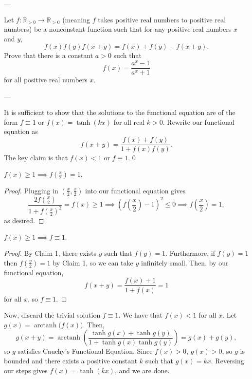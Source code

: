 
---

Let $f:\mathbb R_{>0}\to\mathbb R_{>0}$ (meaning $f$ takes positive real numbers to positive real numbers) be a nonconstant function such that for any positive real numbers $x$ and $y$, \[f(x)f(y)f(x+y)=f(x)+f(y)-f(x+y).\]
Prove that there is a constant $a>0$ such that \[f(x)=\frac{a^x-1}{a^x+1}\]
for all positive real numbers $x$.

---

It is sufficient to show that the solutions to the functional equation are of the form $f\equiv 1$ or $f(x)=\tanh(kx)$ for all real $k>0$. Rewrite our functional equation as \[f(x+y)=\frac{f(x)+f(y)}{1+f(x)f(y)}.\]The key claim is that $f(x)<1$ or $f\equiv 1$.
\setcounter{iclaim}0
\begin{iclaim}
    $f(x)\ge 1\implies f(\tfrac x2)=1$.
\end{iclaim}
\begin{proof}
    Plugging in $(\tfrac x2, \tfrac x2)$ into our functional equation gives \[\frac{2f(\tfrac x2)}{1+f(\tfrac x2)^2}=f(x)\ge 1\implies \left(f\left(\frac x2\right)-1\right)^2\le 0\implies f\left(\frac x2\right)=1,\]
    as desired.
\end{proof}
\begin{iclaim}
    $f(x)\ge 1\implies f\equiv 1$.
\end{iclaim}
\begin{proof}
    By Claim 1, there exists $y$ such that $f(y)=1$. Furthermore, if $f(y)=1$ then $f(\tfrac y2)=1$ by Claim 1, so we can take  $y$ infinitely small. Then, by our functional equation, \[f(x+y)=\frac{f(x)+1}{1+f(x)}=1\]for all $x$, so $f\equiv 1$.
\end{proof}

Now, discard the trivial solution $f\equiv 1$. We have that $f(x)<1$ for all $x$. Let $g(x)=\operatorname{arctanh}\big(f(x)\big)$. Then, \[g(x+y)=\operatorname{arctanh}\left(\frac{\tanh g(x)+\tanh g(y)}{1+\tanh g(x)\tanh g(y)}\right)=g(x)+g(y),\]so $g$ satisfies Cauchy's Functional Equation. Since $f(x)>0$, $g(x)>0$, so $g$ is bounded and there exists a positive constant $k$ such that $g(x)=kx$. Reversing our steps gives $f(x)=\tanh(kx)$, and we are done.

